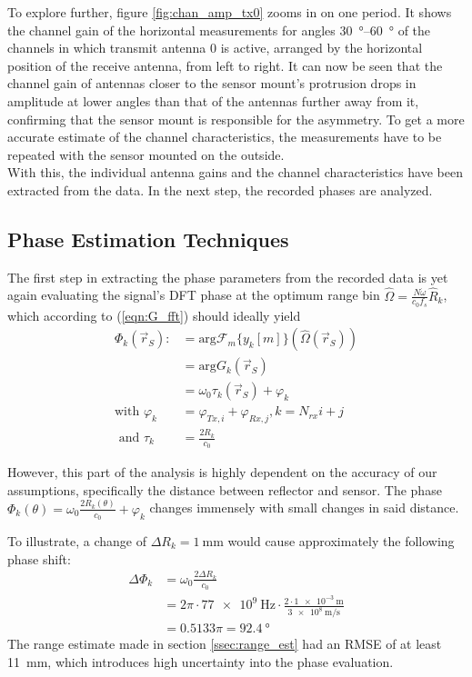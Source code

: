 To explore further, figure \ref{fig:chan_amp_tx0} zooms in on one period.
It shows the channel gain of the horizontal measurements for angles \SIrange{30}{60}{\degree}
of the channels in which transmit antenna 0 is active, arranged by the horizontal position of the receive antenna, from left to right.
It can now be seen that the channel gain of antennas closer to the sensor mount's protrusion drops
in amplitude at lower angles than that of the antennas further away from it,
confirming that the sensor mount is responsible for the asymmetry.
To get a more accurate estimate of the channel characteristics,
the measurements have to be repeated with the sensor mounted on the outside.\\

With this, the individual antenna gains and the channel characteristics have been extracted from the data.
In the next step, the recorded phases are analyzed.

\newpage
\subsection{Phase Estimation Techniques}
The first step in extracting the phase parameters from the recorded data is yet again
evaluating the signal's DFT phase at the optimum range bin $\hat \Omega = \frac{ N \dot \omega}{c_0 f_s}\hat R_k$,
which according to (\ref{eqn:G_fft}) should ideally yield
\begin{align}
    \Phi_k(\vec r_S) :     & = \text{arg} \mathcal{F}_m\{y_k[m]\} (\hat \Omega(\vec r_S)) \\
                           & =    \text{arg}G_k(\vec r_S)                                 \\
                           & = \omega_0\tau_k(\vec r_S) + \varphi_k                       \\
    \text{with } \varphi_k & = \varphi_{Tx,i}+\varphi_{Rx,j},  k=N_{rx}i+j                \\
    \text{ and } \tau_k    & = \frac{2R_k}{c_0}
\end{align}

However, this part of the analysis is highly dependent on the accuracy of our assumptions,
specifically the distance between reflector and sensor.
The phase $\Phi_k(\theta) = \omega_0 \frac{2R_k(\theta)}{c_0} + \varphi_k$ changes immensely with small changes in said distance.

To illustrate, a change of $\Delta R_k = \SI{1}{\mm}$ would cause approximately the following phase shift:
\begin{align*}
    \Delta\Phi_k & = \omega_0 \frac{2\Delta R_k}{c_0}                                            \\
                 & = 2\pi \cdot \SI{77e9}{\Hz} \cdot \frac{2\cdot\SI{1e-3}{\m}}{\SI{3e8}{\m/\s}} \\
                 & = 0.5133 \pi = \SI{92.4}{\degree}
\end{align*}
The range estimate made in section \ref{ssec:range_est} had an RMSE of at least \SI{11}{\mm},
which introduces high uncertainty into the phase evaluation. \\

